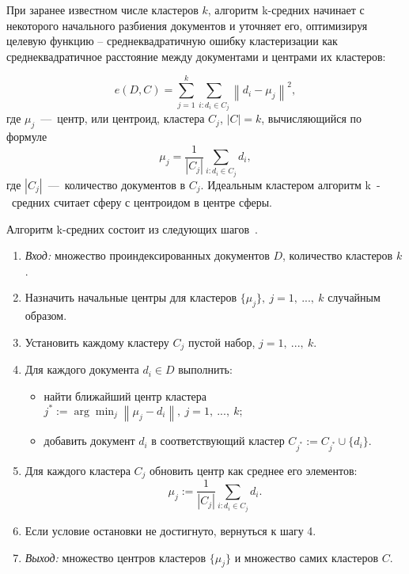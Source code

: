 При заранее известном числе кластеров \( k \), алгоритм k-средних начинает с некоторого начального разбиения документов и уточняет его, оптимизируя целевую функцию – среднеквадратичную ошибку кластеризации как среднеквадратичное расстояние между документами и центрами их кластеров:

\begin{equation}
	e(D, C) = \sum_{j=1}^{k} \sum_{i:d_i \in C_j} \left\| d_i - \mu_j \right\|^2,
\end{equation}
где \( \mu_j \)~---~центр, или центроид, кластера \( C_j \), \( |C| = k \), вычисляющийся по формуле
\begin{equation}
	\mu_j = \frac{1}{|C_j|} \sum_{i:d_i \in C_j} d_i,
\end{equation}
где \( |C_j| \)~---~количество документов в \( C_j \). Идеальным кластером алгоритм k~-~средних считает сферу с центроидом в центре сферы.

Алгоритм k-средних состоит из следующих шагов~\cite{main-book}.
\begin{enumerate}
	\item \textit{Вход:} множество проиндексированных документов \( D \), количество кластеров \( k \). %
	\item Назначить начальные центры для кластеров \( \{ \mu_j \},\ j = 1,\ ...,\ k \) случайным образом. %
	\item Установить каждому кластеру \( C_j \) пустой набор, \( j = 1,\ ...,\ k \). %
	\item Для каждого документа \( d_i \in D \) выполнить: %
	\begin{itemize}
		\item найти ближайший центр кластера \( j^* := \arg \min_j \left\| \mu_j - d_i \right\|,\ j = 1,\ ...,\ k; \) %
		\item добавить документ \( d_i \) в соответствующий кластер \( C_{j^*} := C_{j^*} \cup \{d_i\}. \) %
	\end{itemize}
	\item Для каждого кластера \( C_j \) обновить центр как среднее его элементов: %
	\[ \mu_j := \frac{1}{|C_j|} \sum_{i:d_i \in C_j} d_i. \]
	\item Если условие остановки не достигнуто, вернуться к шагу 4. %
	\item \textit{Выход:} множество центров кластеров \( \{ \mu_j \} \) и множество самих кластеров \( C \). %
\end{enumerate}

